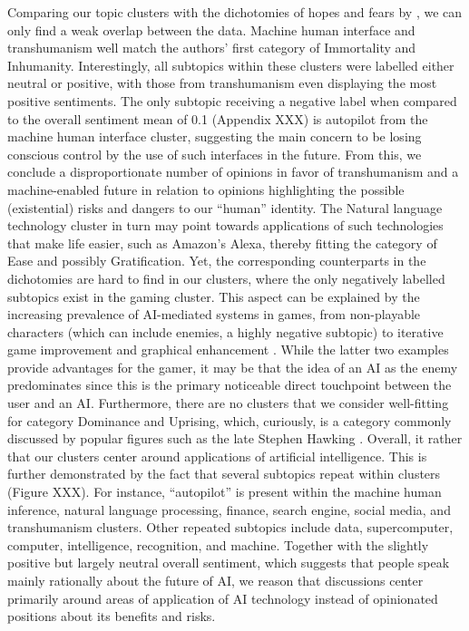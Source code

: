 Comparing our topic clusters with the dichotomies of hopes and fears by \citet{cave2019}, we can only find a weak overlap between the data. Machine human interface and transhumanism well match the authors’ first category of Immortality and Inhumanity. Interestingly, all subtopics within these clusters were labelled either neutral or positive, with those from transhumanism even displaying the most positive sentiments. The only subtopic receiving a negative label when compared to the overall sentiment mean of 0.1 (Appendix XXX) is autopilot from the machine human interface cluster, suggesting the main concern to be losing conscious control by the use of such interfaces in the future. From this, we conclude a disproportionate number of opinions in favor of transhumanism and a machine-enabled future in relation to opinions highlighting the possible (existential) risks and dangers to our “human” identity. The Natural language technology cluster in turn may point towards applications of such technologies that make life easier, such as Amazon’s Alexa, thereby fitting the category of Ease and possibly Gratification. Yet, the corresponding counterparts in the dichotomies are hard to find in our clusters, where the only negatively labelled subtopics exist in the gaming cluster. This aspect can be explained by the increasing prevalence of AI-mediated systems in games, from non-playable characters (which can include enemies, a highly negative subtopic) to iterative game improvement and graphical enhancement \citep{anandrise}. While the latter two examples provide advantages for the gamer, it may be that the idea of an AI as the enemy predominates since this is the primary noticeable direct touchpoint between the user and an AI.
Furthermore, there are no clusters that we consider well-fitting for \citet{cave2019} category Dominance and Uprising, which, curiously, is a category commonly discussed by popular figures such as the late Stephen Hawking \citep{hawking2014transcendence}. Overall, it rather that our clusters center around applications of artificial intelligence. This is further demonstrated by the fact that several subtopics repeat within clusters (Figure XXX). For instance, “autopilot” is present within the machine human inference, natural language processing, finance, search engine, social media, and transhumanism clusters. Other repeated subtopics include data, supercomputer, computer, intelligence, recognition, and machine. Together with the slightly positive but largely neutral overall sentiment, which suggests that people speak mainly rationally about the future of AI, we reason that discussions center primarily around areas of application of AI technology instead of opinionated positions about its benefits and risks.

